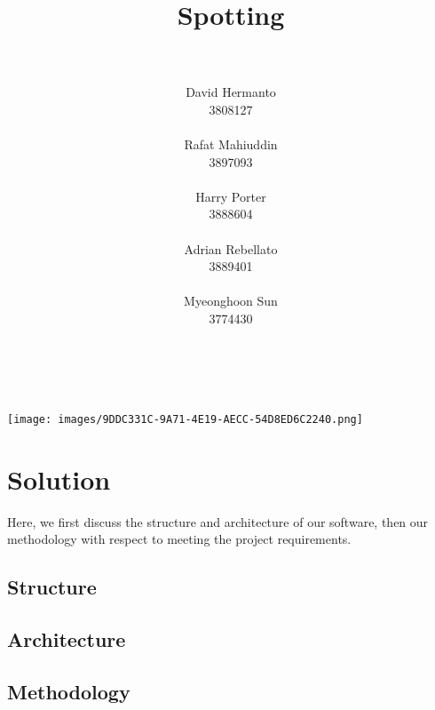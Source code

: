 \documentclass[10pt,english]{article}
\title{\huge{\textbf{Spotting}}}
\author{
    \\\\
    David Hermanto\\
    \small 3808127\\
    \\
    Rafat Mahiuddin\\
    \small 3897093\\
    \\
    Harry Porter\\
    \small 3888604\\
    \\
    Adrian Rebellato\\
    \small 3889401\\
    \\
    Myeonghoon Sun\\
    \small 3774430\\
    \\\\
}
\date{}
\begin{document}
\maketitle
\thispagestyle{empty}
\clearpage

\vspace*{\fill}
\begin{center}
\texttt{[image: images/9DDC331C-9A71-4E19-AECC-54D8ED6C2240.png]}
\end{center}
\vfill
\thispagestyle{empty}

\clearpage


\section*{Solution}

Here, we first discuss the structure and architecture of our software, then our methodology with respect to meeting the project requirements.


\subsection*{Structure}


\clearpage

\subsection*{Architecture}



\clearpage

\subsection*{Methodology}
\end{document}
